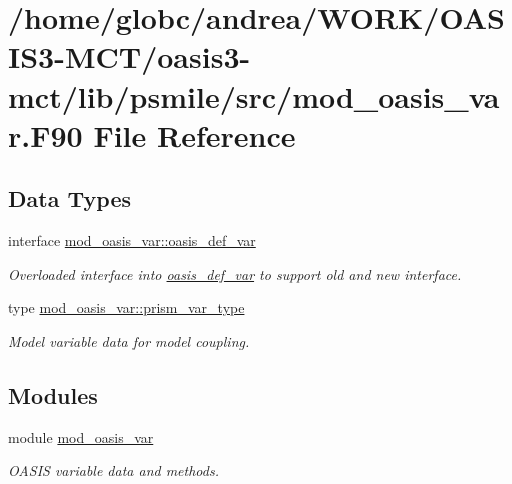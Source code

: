 \hypertarget{mod__oasis__var_8_f90}{}\section{/home/globc/andrea/\+W\+O\+R\+K/\+O\+A\+S\+I\+S3-\/\+M\+C\+T/oasis3-\/mct/lib/psmile/src/mod\+\_\+oasis\+\_\+var.F90 File Reference}
\label{mod__oasis__var_8_f90}
\subsection*{Data Types}
\begin{DoxyCompactItemize}
\item 
interface \hyperlink{interfacemod__oasis__var_1_1oasis__def__var}{mod\+\_\+oasis\+\_\+var\+::oasis\+\_\+def\+\_\+var}
\begin{DoxyCompactList}\small\item\em Overloaded interface into \hyperlink{interfacemod__oasis__var_1_1oasis__def__var}{oasis\+\_\+def\+\_\+var} to support old and new interface. \end{DoxyCompactList}\item 
type \hyperlink{structmod__oasis__var_1_1prism__var__type}{mod\+\_\+oasis\+\_\+var\+::prism\+\_\+var\+\_\+type}
\begin{DoxyCompactList}\small\item\em Model variable data for model coupling. \end{DoxyCompactList}\end{DoxyCompactItemize}
\subsection*{Modules}
\begin{DoxyCompactItemize}
\item 
module \hyperlink{namespacemod__oasis__var}{mod\+\_\+oasis\+\_\+var}
\begin{DoxyCompactList}\small\item\em O\+A\+S\+IS variable data and methods. \end{DoxyCompactList}\end{DoxyCompactItemize}
